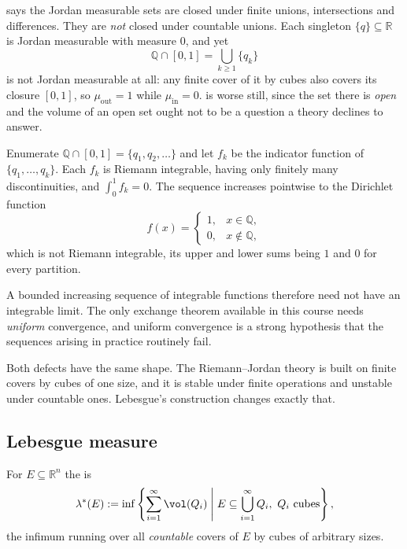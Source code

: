 \begin{example}
\label{ex:lebesgue_defect_sets}
 says the Jordan measurable sets are closed under finite
unions, intersections and differences. They are \emph{not} closed under countable unions. Each
singleton $\{q\} \subseteq \mathbb{R}$ is Jordan measurable with measure $0$, and yet
\[\mathbb{Q}\cap[0,1] = \bigcup_{k\ge1}\{q_k\}\]
is not Jordan measurable at all: any finite cover of it by cubes also covers its closure $[0,1]$,
so $\mu_{\mathrm{out}} = 1$ while $\mu_{\mathrm{in}} = 0$. 
is worse still, since the set there is \emph{open} and the volume of an open set ought not to be a
question a theory declines to answer.
\end{example}

\begin{example}
\label{ex:lebesgue_defect_limits}
Enumerate $\mathbb{Q}\cap[0,1] = \{q_1,q_2,\dots\}$ and let $f_k$ be the indicator function of
$\{q_1,\dots,q_k\}$. Each $f_k$ is Riemann integrable, having only finitely many discontinuities,
and $\int_0^1 f_k = 0$. The sequence increases pointwise to the Dirichlet function
\[f(x) = \begin{cases} 1, & x \in \mathbb{Q}, \\ 0, & x \notin \mathbb{Q},\end{cases}\]
which is not Riemann integrable, its upper and lower sums being $1$ and $0$ for every partition.

A bounded increasing sequence of integrable functions therefore need not have an integrable limit.
The only exchange theorem available in this course needs \emph{uniform} convergence, and uniform
convergence is a strong hypothesis that the sequences arising in practice routinely fail.
\end{example}

Both defects have the same shape. The Riemann--Jordan theory is built on finite covers by cubes of
one size, and it is stable under finite operations and unstable under countable ones. Lebesgue's
construction changes exactly that.

\subsection{Lebesgue measure}

\begin{definition}
\label{def:lebesgue_outer_measure}
For $E \subseteq \mathbb{R}^n$ the 
 is
\[\lambda^*(E) := \inf\left\{ \sum_{i=1}^\infty \vol(Q_i) \;\middle|\;
E \subseteq \bigcup_{i=1}^\infty Q_i,\ Q_i \text{ cubes} \right\},\]
the infimum running over all \emph{countable} covers of $E$ by cubes of arbitrary sizes.
\end{definition}

